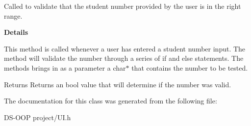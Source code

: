 Called to validate that the student number provided by the user is in the right range. 

{\bfseries Details}

This method is called whenever a user has entered a student number input. The method will validate the number through a series of if and else statements. The methods brings in as a parameter a char$\ast$ that contains the number to be tested.

\begin{DoxyReturn}{Returns}
Returns an bool value that will determine if the number was valid. 
\end{DoxyReturn}


The documentation for this class was generated from the following file\-:\begin{DoxyCompactItemize}
\item 
D\-S-\/\-O\-O\-P project/U\-I.\-h\end{DoxyCompactItemize}
